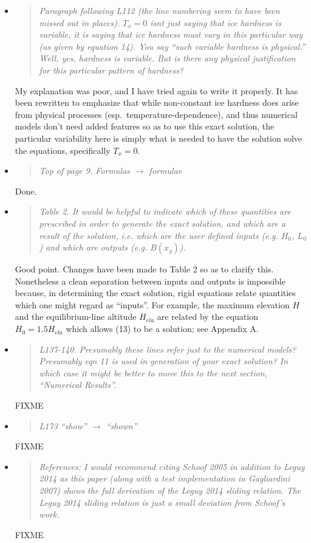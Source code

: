 \documentclass[11pt,reqno]{amsart}
\newcommand{\reply}[2]{
\medskip\medskip
\item  \begin{quote}
\emph{#1}
\end{quote}

\smallskip
\noindent #2}
\begin{document}
\begin{itemize}
\reply{Paragraph following L112 (the line numbering seem to have been missed out in places). $T_x=0$ isnt just saying that ice hardness is variable, it is saying that ice hardness must vary in this particular way (as given by equation 14).  You say ``such variable hardness is physical.''  Well, yes, hardness is variable. But is there any physical justification for this particular pattern of hardness?}
{My explanation was poor, and I have tried again to write it properly.  It has been rewritten to emphasize that while non-constant ice hardness does arise from physical processes (esp.~temperature-dependence), and thus numerical models don't need added features so as to use this exact solution, the particular variability here is simply what is needed to have the solution solve the equations, specifically $T_x=0$.}

\reply{Top of page 9. Formulas $\to$ formulae}
{Done.}

\reply{Table 2. It would be helpful to indicate which of these quantities are prescribed in order to generate the exact solution, and which are a result of the solution, i.e. which are the user defined inputs (e.g. $H_0$, $L_0$) and which are outputs (e.g. $B(x_g)$).}
{Good point.  Changes have been made to Table 2 so as to clarify this.  Nonetheless a clean separation between inputs and outputs is impossible because, in determining the exact solution, rigid equations relate quantities which one might regard as ``inputs''.  For example, the maximum elevation $H$ and the equilibrium-line altitude $H_{ela}$ are related by the equation $H_0 = 1.5 H_{ela}$ which allows (13) to be a solution; see Appendix A.}

\reply{L137-140. Presumably these lines refer just to the numerical models? Presumably eqn 11 is used in generation of your exact solution? In which case it might be better to move this to the next section, ``Numerical Results''.}
{FIXME}

\reply{L173 ``show'' $\to$ ``shown''}
{FIXME}

\reply{References: I would recommend citing Schoof 2005 in addition to Leguy 2014 as this paper (along with a test implementation in Gagliardini 2007) shows the full derivation of the Leguy 2014 sliding relation. The Leguy 2014 sliding relation is just a small deviation from Schoof's work.}
{FIXME}

\end{itemize}


%
%
\end{document}
